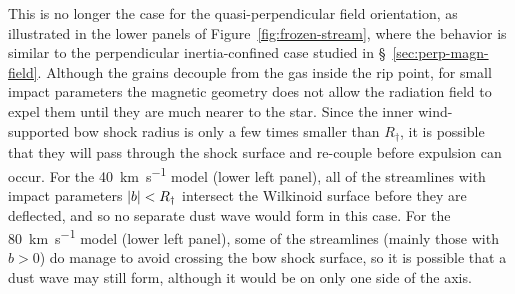 This is no longer the case for the quasi-perpendicular field
orientation, as illustrated in the lower panels of
Figure~\ref{fig:frozen-stream}, where the behavior is similar to the
perpendicular inertia-confined case studied in
\S~\ref{sec:perp-magn-field}.  Although the grains decouple from the
gas inside the rip point, for small impact parameters the magnetic
geometry does not allow the radiation field to expel them until they
are much nearer to the star.  Since the inner wind-supported bow shock
radius is only a few times smaller than \(R_\dag\), it is possible that
they will pass through the shock surface and re-couple before
expulsion can occur.  For the \SI{40}{km.s^{-1}} model (lower left
panel), all of the streamlines with impact parameters
\(\lvert b\rvert < R_\dag\) intersect the Wilkinoid surface before they are
deflected, and so no separate dust wave would form in this case.  For
the \SI{80}{km.s^{-1}} model (lower left panel), some of the
streamlines (mainly those with \(b > 0\)) do manage to avoid crossing
the bow shock surface, so it is possible that a dust wave may still
form, although it would be on only one side of the axis.


